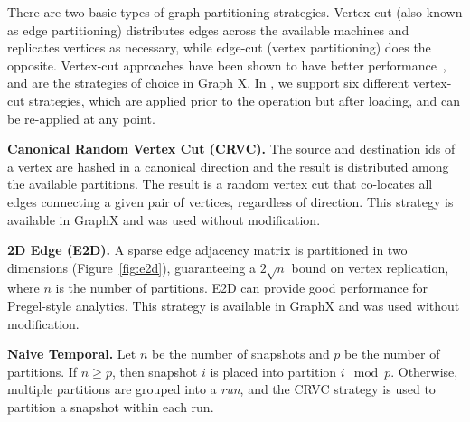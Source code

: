 There are two basic types of graph partitioning strategies. Vertex-cut
(also known as edge partitioning) distributes edges across the
available machines and replicates vertices as necessary, while
edge-cut (vertex partitioning) does the opposite.  Vertex-cut
approaches have been shown to have better
performance~\cite{Gonzalez2012}, and are the strategies of choice in
Graph X.  In \ql, we support six different vertex-cut strategies,
which are applied prior to the operation but after loading, and can be
re-applied at any point.

{\bf Canonical Random Vertex Cut (CRVC).}  The source and destination
ids of a vertex are hashed in a canonical direction and the result is
distributed among the available partitions.  The result is a random
vertex cut that co-locates all edges connecting a given pair of
vertices, regardless of direction.  This strategy is available in
GraphX and was used without modification.

{\bf 2D Edge (E2D).}  A sparse edge adjacency matrix is partitioned in
two dimensions (Figure~\ref{fig:e2d}), guaranteeing a $2 \sqrt{n}$
bound on vertex replication, where $n$ is the number of
partitions. E2D can provide good performance for Pregel-style
analytics.  This strategy is available in GraphX and was used without
modification.


{\bf Naive Temporal.} Let $n$ be the number of snapshots and $p$ be
the number of partitions.  If $n \geq p$, then snapshot $i$ is placed
into partition $i \mod p$.  Otherwise, multiple partitions are grouped
into a {\em run}, and the CRVC strategy is used to partition a
snapshot within each run.



